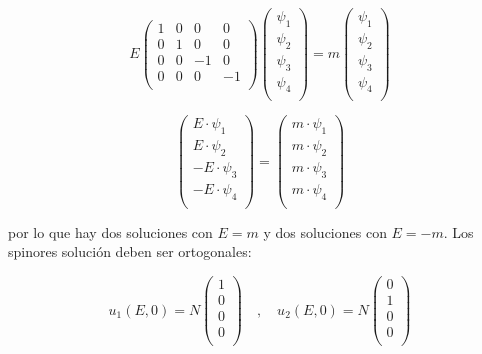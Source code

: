 $$ E\begin{pmatrix}
    1 & 0 & 0 & 0 \\
    0 & 1 & 0 & 0 \\
    0 & 0 & -1 & 0 \\
    0 & 0 & 0 & -1 \\
\end{pmatrix}\begin{pmatrix}
    \psi_1 \\
    \psi_2 \\
    \psi_3 \\
    \psi_4 \\
\end{pmatrix} = m\begin{pmatrix}
    \psi_1 \\
    \psi_2 \\
    \psi_3 \\
    \psi_4 \\
\end{pmatrix}  $$

$$ \begin{pmatrix}
    E\cdot\psi_1 \\
    E\cdot\psi_2 \\
    -E\cdot\psi_3 \\
    -E\cdot\psi_4 \\
\end{pmatrix} = \begin{pmatrix}
    m\cdot\psi_1 \\
    m\cdot\psi_2 \\
    m\cdot\psi_3 \\
    m\cdot\psi_4 \\
\end{pmatrix}  $$

por lo que hay dos soluciones con $E=m$ y dos soluciones con $E=-m$. Los spinores solución deben ser ortogonales:

$$ u_1(E,0) = N\begin{pmatrix}
    1 \\
    0 \\
    0 \\
    0 \\
\end{pmatrix} \quad , \quad u_2(E,0) = N\begin{pmatrix}
    0 \\
    1 \\
    0 \\
    0 \\
\end{pmatrix} $$

